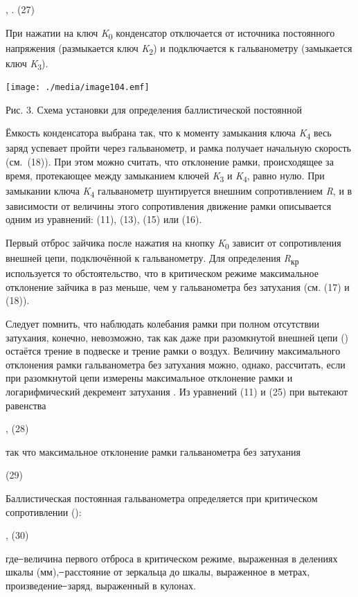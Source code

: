 \documentclass[]{article}
\begin{document}
, . (27)

При нажатии на ключ \emph{K}\textsubscript{0} конденсатор отключается от
источника постоянного напряжения (размыкается ключ
\emph{K}\textsubscript{2}) и подключается к гальванометру (замыкается
ключ \emph{K}\textsubscript{3}).

\texttt{[image: ./media/image104.emf]}

Рис. 3. Схема установки для определения баллистической постоянной

Ёмкость конденсатора выбрана так, что к моменту замыкания ключа
\emph{K}\textsubscript{4} весь заряд успевает пройти через гальванометр,
и рамка получает начальную скорость (см.~(18)). При этом можно считать,
что отклонение рамки, происходящее за время, протекающее между
замыканием ключей \emph{K}\textsubscript{3} и \emph{K}\textsubscript{4},
равно нулю. При замыкании ключа \emph{K}\textsubscript{4} гальванометр
шунтируется внешним сопротивлением \emph{R}, и в зависимости от величины
этого сопротивления движение рамки описывается одним из уравнений: (11),
(13), (15) или (16).

Первый отброс зайчика после нажатия на кнопку \emph{K}\textsubscript{0}
зависит от сопротивления внешней цепи, подключённой к гальванометру. Для
определения \emph{R}\textsubscript{кр} используется то обстоятельство,
что в критическом режиме максимальное отклонение зайчика в раз меньше,
чем у гальванометра без затухания (см. (17) и (18)).

Следует помнить, что наблюдать колебания рамки при полном отсутствии
затухания, конечно, невозможно, так как даже при разомкнутой внешней
цепи () остаётся трение в подвеске и трение рамки о воздух. Величину
максимального отклонения рамки гальванометра без затухания можно,
однако, рассчитать, если при разомкнутой цепи измерены максимальное
отклонение рамки и логарифмический декремент затухания . Из уравнений
(11) и (25) при вытекают равенства

, (28)

так что максимальное отклонение рамки гальванометра без затухания

(29)

Баллистическая постоянная гальванометра определяется при критическом
сопротивлении ():

, (30)

где ̶ величина первого отброса в критическом режиме, выраженная в
делениях шкалы (мм), ̶ расстояние от зеркальца до шкалы, выраженное в
метрах, произведение ̶ заряд, выраженный в кулонах.
\end{document}
